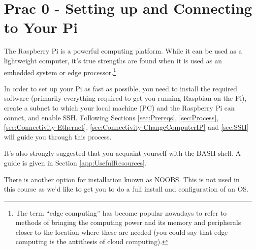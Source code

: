 \setcounter{section}{-1}
\section{Prac 0 - Setting up and Connecting to Your Pi}
The Raspberry Pi is a powerful computing platform. While it can be used as a lightweight computer, it's true strengths are found when it is used as an embedded system or edge processor.\footnote{The term “edge computing” has become popular nowadays to refer to methods of bringing the computing power and its memory and peripherals closer to the location where these are needed (you could say that edge computing is the antithesis of cloud computing).}

In order to set up your Pi as fast as possible, you need to install the required software (primarily everything required to get you running Raspbian on the Pi), create a subnet to which your local machine (PC) and the Raspberry Pi can connct, and enable SSH. Following Sections \ref{sec:Prereqs}, \ref{sec:Process}, \ref{sec:Connectivity-Ethernet}, \ref{sec:Connectivity-ChangeComputerIP} and \ref{sec:SSH} will guide you through this process.

It's also strongly suggested that  you acquaint yourself with the BASH shell. A guide is given in Section \ref{app:UsefulResources}.

There is another option for installation known as NOOBS. This is not used in this course as we'd like to get you to do a full install and configuration of an OS.

